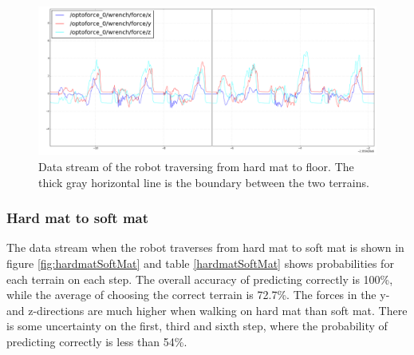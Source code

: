 \documentclass[USenglish]{ifimaster}  %
\begin{document}
\begin{figure}[h]
	\centering
	\includegraphics[width=\textwidth,height=\textheight,keepaspectratio]{Figures/MB3_3_Gulvet_line2}
	\caption[Data stream of the transition from hard mat to floor]{Data stream of the robot traversing from hard mat to floor. The thick gray horizontal line is the boundary between the two terrains.}
	\label{fig:mb3Gulvet}
\end{figure}
	
	
\begin{table}[h]
	\centering
	\caption[Results of transistion from hard mat to floor]{Estimated probability of each terrain per step walking from hard mat to floor. Values are marked green to represent correct predictions. For incorrect predictions, the actual value is marked yellow while the predicted value is marked red.}
	\label{tab:mb3Gulvet}
\end{table}
\FloatBarrier
\clearpage

\subsubsection{Hard mat to soft mat} \label{sec:hmssm}
 The data stream when the robot traverses from hard mat to soft mat is shown in figure \ref{fig:hardmatSoftMat} and table \ref{hardmatSoftMat} shows probabilities for each terrain on each step. The overall accuracy of predicting correctly is 100\%, while the average of choosing the correct terrain is 72.7\%. The forces in the y- and z-directions are much higher when walking on hard mat than soft mat. There is some uncertainty on the first, third and sixth step, where the probability of predicting correctly is less than 54\%.
\end{document}
